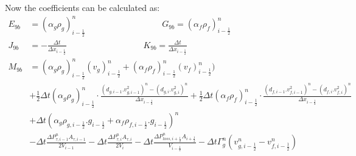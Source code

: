 \documentclass[11pt,letterpaper,titlepage]{article}
\newcommand{\half}{\frac{1}{2}}
\begin{document}
Now the coefficients can be calculated as:
\begin{equation*}
\begin{aligned}
 E_{9b} &= (\alpha_g\rho_g )_{i-\half}^{n}   \quad \quad \quad \quad \quad \quad \quad \quad \quad 
G_{9b}   = (\alpha_f\rho_f )_{i-\half}^{n} \\
 J_{9b} &= -\frac{\Delta t}{\Delta x_{i-\half}} \quad \quad \quad \quad \quad \quad \quad \quad \quad 
K_{9b}   =  \frac{\Delta t}{\Delta x_{i-\half}}\\
M_{9b} &= (\alpha_g\rho_g )_{i-\half}^{n}(v_g)^{n}_{i-\half}
 +(\alpha_f\rho_f )_{i-\half}^{n}(v_f)^{n}_{i-\half})\\
&+\half \Delta t (\alpha_g \rho_{g})_{i-\half}^n \cdot\frac{(d_{g,i-1}.v_{g,i-1}^2)^n-(d_{g,i}.v_{g,i}^2)^n}{\Delta x_{i-\half}} 
+\half\Delta t (\alpha_f \rho_{f})_{i-\half}^n \cdot\frac{(d_{f,i-1}.v_{f,i-1}^2)^n-(d_{f,i}.v_{f,i}^2)^n}{\Delta x_{i-\half}} \\
&+ \Delta t(\alpha_g \rho_{g,i-\half}.g_{i-\half} + \alpha_f\rho_{f,i-\half}.g_{i-\half})^n\\
&-\Delta t\frac{\Delta P_{\tau,i-1}^n A_{\tau,i-1}}{2V_{i-1}}
 -\Delta t\frac{\Delta P_{\tau,i}^n A_{\tau,i}}{2V_{i}} 
 -\Delta t\frac{\Delta P_{loss,i+\half}^n A_{i+\half}}{V_{i-\half}} - \Delta t\Gamma_g^n (v_{g,i-\half}^n - v_{f,i-\half}^n)
\end{aligned}
\end{equation*}



\newpage
\end{document}

